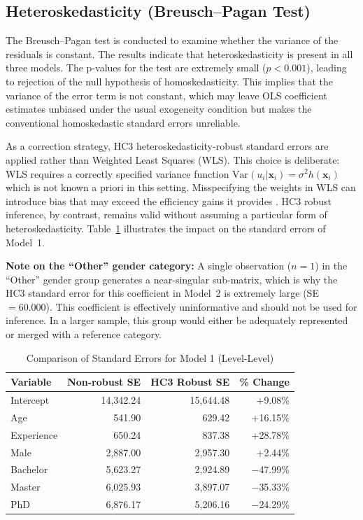 \documentclass[12pt, a4paper]{article}
\begin{document}
\subsection{Heteroskedasticity (Breusch--Pagan Test)}
The Breusch--Pagan test \citep{breusch1979} is conducted to examine whether the variance of the residuals is constant.
The results indicate that heteroskedasticity is present in all three models. The p-values for the test are extremely small ($p < 0.001$), leading to rejection of the null hypothesis of homoskedasticity.
This implies that the variance of the error term is not constant, which may leave OLS coefficient estimates unbiased under the usual exogeneity condition but makes the conventional homoskedastic standard errors unreliable.

As a correction strategy, HC3 heteroskedasticity-robust standard errors are applied rather than Weighted Least Squares (WLS). This choice is deliberate: WLS requires a correctly specified variance function $\text{Var}(u_i | \mathbf{x}_i) = \sigma^2 h(\mathbf{x}_i)$ which is not known a priori in this setting. Misspecifying the weights in WLS can introduce bias that may exceed the efficiency gains it provides \citep{wooldridge2010}. HC3 robust inference, by contrast, remains valid without assuming a particular form of heteroskedasticity. Table~\ref{tab:se_compare} illustrates the impact on the standard errors of Model~1.

\textbf{Note on the ``Other'' gender category:} A single observation ($n = 1$) in the ``Other'' gender group generates a near-singular sub-matrix, which is why the HC3 standard error for this coefficient in Model~2 is extremely large (SE $= 60.000$). This coefficient is effectively uninformative and should not be used for inference. In a larger sample, this group would either be adequately represented or merged with a reference category.

\begin{table}[htpb]
\centering
\caption{Comparison of Standard Errors for Model 1 (Level-Level)}
\label{tab:se_compare}
\begin{tabular}{lrrr}
\toprule
\textbf{Variable} & \textbf{Non-robust SE} & \textbf{HC3 Robust SE} & \textbf{\% Change} \\
\midrule
Intercept & 14,342.24 & 15,644.48 & +9.08\% \\
Age & 541.90 & 629.42 & +16.15\% \\
Experience & 650.24 & 837.38 & +28.78\% \\
Male & 2,887.00 & 2,957.30 & +2.44\% \\
Bachelor & 5,623.27 & 2,924.89 & $-$47.99\% \\
Master & 6,025.93 & 3,897.07 & $-$35.33\% \\
PhD & 6,876.17 & 5,206.16 & $-$24.29\% \\
\bottomrule
\end{tabular}
\end{table}
\end{document}

